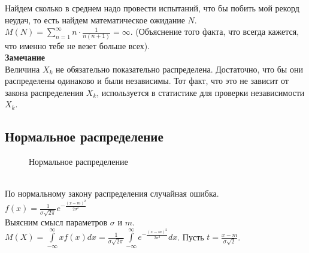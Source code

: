 \documentclass[russian, 12pt, fleqn,x11names]{article}
\begin{document}
Найдем сколько в среднем надо провести испытаний, что бы побить мой рекорд неудач, то есть найдем математическое ожидание $N$. $M(N) = \sum\limits_{n=1}^{\infty} n\cdot  \frac{1}{n(n+1)} = \infty$. (Объяснение того факта, что всегда кажется, что именно тебе не везет больше всех).\\
\textbf{Замечание\ } \\
\noindent
Величина $X_k$ не обязательно показательно распределена. Достаточно, что бы они распределены одинаково и были независимы. Тот факт, что это не зависит от закона распределения $X_k$, используется в статистике для проверки независимости $X_k$.\\
\subsection{Нормальное распределение}
\noindent
\begin{figure}[!h]
\caption{Нормальное распределение}
\end{figure}\\
По нормальному закону распределения случайная ошибка.\\
$f(x) = \frac{1}{\sigma \sqrt{2\pi}}e^{-\frac{(x-m)^2}{2\sigma^2}}$\\
Выясним смысл параметров $\sigma$ и $m$.\\
$M(X) = \int\limits_{-\infty}^{\infty}   xf(x)dx = \frac{1}{\sigma \sqrt{2\pi} } \int\limits_{-\infty}^{\infty}e^{-\frac{(x-m)^2}{2\sigma^2}}dx$. Пусть $t = \frac{x - m}{\sigma\sqrt{2}}$.\\
\end{document}
